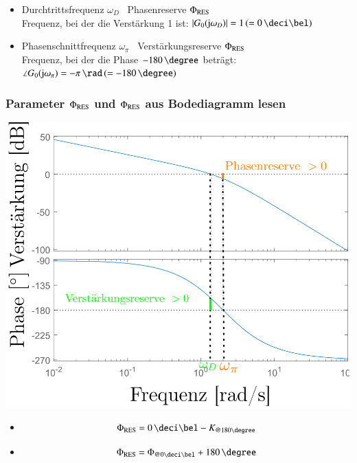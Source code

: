 \begin{itemize}
    \item Durchtrittsfrequenz $\omega_{D}$ \textrightarrow\ Phasenreserve $\Phi_{\rm RES}$ \\
        Frequenz, bei der die Verstärkung 1 ist: $| G_{0}(\jimg \omega_{D})| = 1 \, (= 0 \, \deci \bel)$
    \item Phasenschnittfrequenz $\omega_{\pi}$ \textrightarrow\ Verstärkungsreserve $\Phi_{\rm RES}$ \\
        Frequenz, bei der die Phase $-180 \, \degree$ beträgt: $\angle {G_{0}(\jimg \omega_{\pi})} = - \pi \, \rad \, (= -180 \, \degree)$
\end{itemize}


\subsubsection[Parameter \Phi_{\rm RES} und  \Phi_{\rm RES} aus Bodediagramm lesen]{Parameter $\Phi_{\rm RES}$ und  $\Phi_{\rm RES}$ aus Bodediagramm lesen}

\begin{minipage}[c]{0.55\columnwidth}
    \includegraphics[width=\columnwidth]{images/bodeplot_stabilitaetsreserven.png}
\end{minipage}
\hfill
\begin{minipage}[c]{0.42\columnwidth}
    \raggedright%
    \begin{itemize}
        \item {}  %
            $$ \Phi_{\rm RES} = 0 \, \deci \bel - K_{\text{@} 180 \degree } $$ 

        \item {} %
            $$ \Phi_{\rm RES} = \Phi_{\text{@}0 \deci \bel }  + 180 \, \degree $$ 
    \end{itemize}
\end{minipage}


